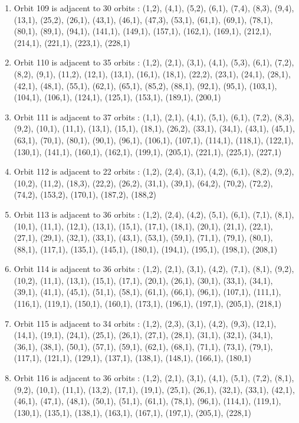 \documentclass[12pt]{article}
\begin{document}
\begin{enumerate}
\item Orbit 109 is adjacent to 30 orbits : (1,2), (4,1), (5,2), (6,1), (7,4), (8,3), (9,4), (13,1), (25,2), (26,1), (43,1), (46,1), (47,3), (53,1), (61,1), (69,1), (78,1), (80,1), (89,1), (94,1), (141,1), (149,1), (157,1), (162,1), (169,1), (212,1), (214,1), (221,1), (223,1), (228,1)
\item Orbit 110 is adjacent to 35 orbits : (1,2), (2,1), (3,1), (4,1), (5,3), (6,1), (7,2), (8,2), (9,1), (11,2), (12,1), (13,1), (16,1), (18,1), (22,2), (23,1), (24,1), (28,1), (42,1), (48,1), (55,1), (62,1), (65,1), (85,2), (88,1), (92,1), (95,1), (103,1), (104,1), (106,1), (124,1), (125,1), (153,1), (189,1), (200,1)
\item Orbit 111 is adjacent to 37 orbits : (1,1), (2,1), (4,1), (5,1), (6,1), (7,2), (8,3), (9,2), (10,1), (11,1), (13,1), (15,1), (18,1), (26,2), (33,1), (34,1), (43,1), (45,1), (63,1), (70,1), (80,1), (90,1), (96,1), (106,1), (107,1), (114,1), (118,1), (122,1), (130,1), (141,1), (160,1), (162,1), (199,1), (205,1), (221,1), (225,1), (227,1)
\item Orbit 112 is adjacent to 22 orbits : (1,2), (2,4), (3,1), (4,2), (6,1), (8,2), (9,2), (10,2), (11,2), (18,3), (22,2), (26,2), (31,1), (39,1), (64,2), (70,2), (72,2), (74,2), (153,2), (170,1), (187,2), (188,2)
\item Orbit 113 is adjacent to 36 orbits : (1,2), (2,4), (4,2), (5,1), (6,1), (7,1), (8,1), (10,1), (11,1), (12,1), (13,1), (15,1), (17,1), (18,1), (20,1), (21,1), (22,1), (27,1), (29,1), (32,1), (33,1), (43,1), (53,1), (59,1), (71,1), (79,1), (80,1), (88,1), (117,1), (135,1), (145,1), (180,1), (194,1), (195,1), (198,1), (208,1)
\item Orbit 114 is adjacent to 36 orbits : (1,2), (2,1), (3,1), (4,2), (7,1), (8,1), (9,2), (10,2), (11,1), (13,1), (15,1), (17,1), (20,1), (26,1), (30,1), (33,1), (34,1), (39,1), (41,1), (45,1), (51,1), (58,1), (61,1), (66,1), (96,1), (107,1), (111,1), (116,1), (119,1), (150,1), (160,1), (173,1), (196,1), (197,1), (205,1), (218,1)
\item Orbit 115 is adjacent to 34 orbits : (1,2), (2,3), (3,1), (4,2), (9,3), (12,1), (14,1), (19,1), (24,1), (25,1), (26,1), (27,1), (28,1), (31,1), (32,1), (34,1), (36,1), (38,1), (50,1), (57,1), (59,1), (62,1), (68,1), (71,1), (73,1), (79,1), (117,1), (121,1), (129,1), (137,1), (138,1), (148,1), (166,1), (180,1)
\item Orbit 116 is adjacent to 36 orbits : (1,2), (2,1), (3,1), (4,1), (5,1), (7,2), (8,1), (9,2), (10,1), (11,1), (13,2), (17,1), (19,1), (25,1), (26,1), (32,1), (33,1), (42,1), (46,1), (47,1), (48,1), (50,1), (51,1), (61,1), (78,1), (96,1), (114,1), (119,1), (130,1), (135,1), (138,1), (163,1), (167,1), (197,1), (205,1), (228,1)

\end{enumerate}
\end{document}
